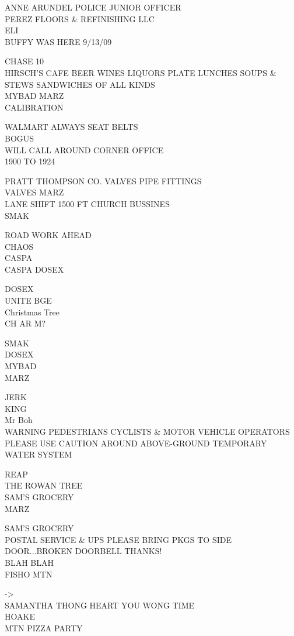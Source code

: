 \documentclass[10pt,letterpaper]{article}
\begin{document}
ANNE ARUNDEL POLICE JUNIOR OFFICER\\
PEREZ FLOORS \& REFINISHING LLC\\
ELI\\
BUFFY WAS HERE 9/13/09

CHASE 10\\
HIRSCH'S CAFE BEER WINES LIQUORS PLATE LUNCHES SOUPS \& STEWS SANDWICHES OF ALL KINDS\\
MYBAD MARZ\\
CALIBRATION

WALMART ALWAYS SEAT BELTS\\
BOGUS\\
WILL CALL AROUND CORNER OFFICE\\
1900 TO 1924

PRATT THOMPSON CO. VALVES PIPE FITTINGS\\
VALVES MARZ\\
LANE SHIFT 1500 FT CHURCH BUSSINES\\
SMAK

ROAD WORK AHEAD\\
CHAOS\\
CASPA\\
CASPA DOSEX

DOSEX\\
UNITE BGE\\
Christmas Tree\\
CH AR M?

SMAK\\
DOSEX\\
MYBAD\\
MARZ

JERK\\
KING\\
Mr Boh\\
WARNING PEDESTRIANS CYCLISTS \& MOTOR VEHICLE OPERATORS PLEASE USE CAUTION AROUND ABOVE{-}GROUND TEMPORARY WATER SYSTEM

REAP\\
THE ROWAN TREE\\
SAM'S GROCERY\\
MARZ

SAM'S GROCERY\\
POSTAL SERVICE \& UPS PLEASE BRING PKGS TO SIDE DOOR...BROKEN DOORBELL THANKS!\\
BLAH BLAH\\
FISHO MTN

{-}>\\
SAMANTHA THONG HEART YOU WONG TIME\\
HOAKE\\
MTN PIZZA PARTY
\end{document}
